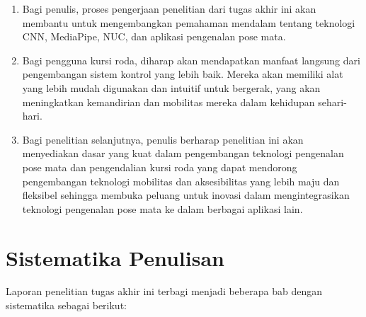 \begin{enumerate}[nolistsep]

  \item Bagi penulis, proses pengerjaan penelitian dari tugas akhir ini akan membantu untuk mengembangkan pemahaman mendalam tentang teknologi CNN, MediaPipe, NUC, dan aplikasi pengenalan pose mata.
  \item Bagi pengguna kursi roda, diharap akan mendapatkan manfaat langsung dari pengembangan sistem kontrol yang lebih baik. Mereka akan memiliki alat yang lebih mudah digunakan dan intuitif untuk bergerak, yang akan meningkatkan kemandirian dan mobilitas mereka dalam kehidupan sehari-hari.
  \item Bagi penelitian selanjutnya, penulis berharap penelitian ini akan menyediakan dasar yang kuat dalam pengembangan teknologi pengenalan pose mata dan pengendalian kursi roda yang dapat mendorong pengembangan teknologi mobilitas dan aksesibilitas yang lebih maju dan fleksibel sehingga membuka peluang untuk inovasi dalam mengintegrasikan teknologi pengenalan pose mata ke dalam berbagai aplikasi lain.

\end{enumerate}

\section{Sistematika Penulisan}
\label{sec:sistematikapenulisan}

Laporan penelitian tugas akhir ini terbagi menjadi beberapa bab dengan sistematika sebagai berikut:

